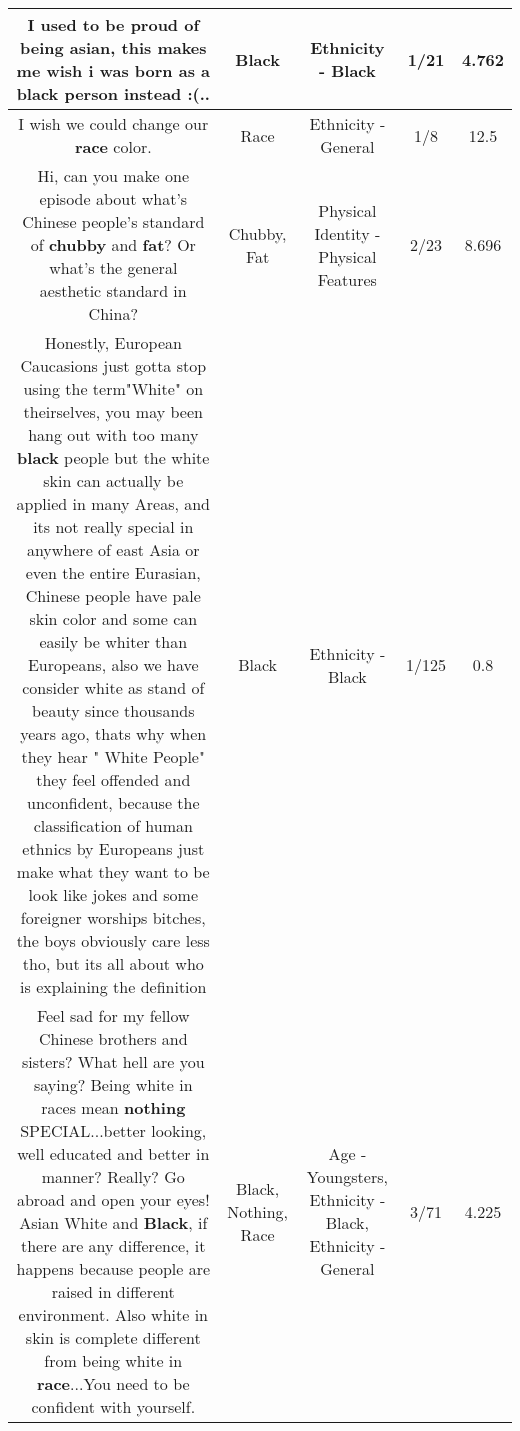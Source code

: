 \documentclass[11pt]{article}
\newlength\mylength
\begin{document}
\begin{center}
\begin{longtable}{|C{.65\mylength}|C{.30\mylength}|C{.12\mylength}|C{.12\mylength}|C{.12\mylength}|}
  \small I used to be proud of being asian, this makes me wish i was born as a \textbf{black} person instead :(..\normalsize   & Black & Ethnicity - Black & 1/21 & 4.762 \\  \hline
  \small I wish we could change our \textbf{race} color.\normalsize   & Race & Ethnicity - General & 1/8 & 12.5 \\  \hline
  \small Hi, can you make one episode about what's Chinese people's standard of \textbf{chubby} and \textbf{fat}? Or what's the general aesthetic standard in China?\normalsize   & Chubby, Fat & Physical Identity - Physical Features & 2/23 & 8.696 \\  \hline
  \small Honestly, European Caucasions just gotta stop using the term"White" on theirselves, you may been hang out with too many \textbf{black} people but the white skin can actually  be applied in many Areas,  and its not really special in anywhere of east Asia or even the entire Eurasian, Chinese people have pale skin color and some can easily be whiter than Europeans, also we have consider white as stand of beauty since thousands years ago, thats why when they hear " White People" they feel offended and unconfident,  because the classification  of human ethnics by Europeans just make what they want to be look like jokes and some foreigner worships bitches, the boys obviously care less tho, but its all about who is explaining the definition\normalsize   & Black & Ethnicity - Black & 1/125 & 0.8 \\  \hline
  \small Feel sad for my fellow Chinese brothers and sisters? What hell are you saying? Being white in races mean \textbf{nothing} SPECIAL...better looking, well educated and better in manner? Really? Go abroad and open your  eyes! Asian White and \textbf{Black}, if there are any difference, it happens because people are raised in different environment. Also white in skin is complete different from being white in \textbf{race}...You need to be confident with yourself.\normalsize   & Black, Nothing, Race & Age - Youngsters, Ethnicity - Black, Ethnicity - General & 3/71 & 4.225 \\  \hline

\end{longtable}
\end{center}
\end{document}
